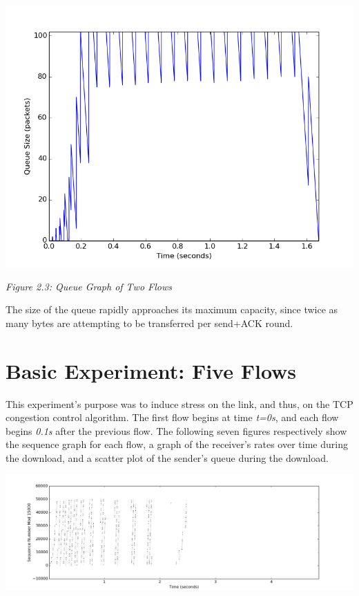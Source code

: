 \documentclass[11pt]{article}
\begin{document}
\includegraphics[width=17cm]{outputs/twoflows/twoflows_queue.png}

\centerline{\emph{Figure 2.3: Queue Graph of Two Flows}}

The size of the queue rapidly approaches its maximum capacity, since twice as many bytes are attempting to be transferred per send+ACK round.




\section{Basic Experiment: Five Flows}

This experiment's purpose was to induce stress on the link, and thus, on the TCP congestion control algorithm. The first flow begins at time \emph{t=0s}, and each flow begins \emph{0.1s} after the previous flow. The following seven figures respectively show the sequence graph for each flow, a graph of the receiver's rates over time during the download, and a scatter plot of the sender's queue during the download.

\includegraphics[width=17cm]{outputs/fiveflows/fiveflows_sequence1000.png}
\end{document}
